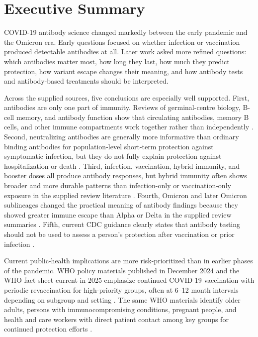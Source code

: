 \documentclass[12pt]{article}
\begin{document}
\tableofcontents
\newpage

\section{Executive Summary}
COVID-19 antibody science changed markedly between the early pandemic and the Omicron era. Early questions focused on whether infection or vaccination produced detectable antibodies at all. Later work asked more refined questions: which antibodies matter most, how long they last, how much they predict protection, how variant escape changes their meaning, and how antibody tests and antibody-based treatments should be interpreted.

Across the supplied sources, five conclusions are especially well supported. First, antibodies are only one part of immunity. Reviews of germinal-centre biology, B-cell memory, and antibody function show that circulating antibodies, memory B cells, and other immune compartments work together rather than independently \cite{ref3,ref4,ref5}. Second, neutralizing antibodies are generally more informative than ordinary binding antibodies for population-level short-term protection against symptomatic infection, but they do not fully explain protection against hospitalization or death \cite{ref3,ref5}. Third, infection, vaccination, hybrid immunity, and booster doses all produce antibody responses, but hybrid immunity often shows broader and more durable patterns than infection-only or vaccination-only exposure in the supplied review literature \cite{ref5}. Fourth, Omicron and later Omicron sublineages changed the practical meaning of antibody findings because they showed greater immune escape than Alpha or Delta in the supplied review summaries \cite{ref3,ref5}. Fifth, current CDC guidance clearly states that antibody testing should not be used to assess a person's protection after vaccination or prior infection \cite{ref1,ref8}.

Current public-health implications are more risk-prioritized than in earlier phases of the pandemic. WHO policy materials published in December 2024 and the WHO fact sheet current in 2025 emphasize continued COVID-19 vaccination with periodic revaccination for high-priority groups, often at 6--12 month intervals depending on subgroup and setting \cite{ref9,ref10,ref11,ref12}. The same WHO materials identify older adults, persons with immunocompromising conditions, pregnant people, and health and care workers with direct patient contact among key groups for continued protection efforts \cite{ref11,ref12}.
\end{document}
